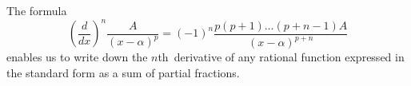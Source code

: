 The formula
\[
\left(\frac{d}{dx}\right)^{n} \frac{A}{(x - \alpha)^{p}}
  = (-1)^{n} \frac{p(p + 1) \dots (p + n - 1)A}{(x - \alpha)^{p+n}}
\]
enables us to write down the $n$th~derivative of any rational function expressed
in the standard form as a sum of partial fractions.

